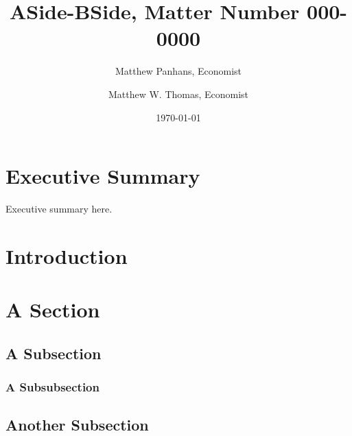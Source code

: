 \documentclass[12pt,final]{bememo}
\title{ASide-BSide, Matter Number 000-0000}
\author{Matthew Panhans, Economist \and Matthew W. Thomas, Economist}
\date{\today}
\begin{document}
\maketitle

\section*{Executive Summary}\label{sec:exec}

Executive summary here.

\section{Introduction}

\econ[2-3]

\section{A Section}

\econ[4]

\subsection{A Subsection}

\econ[5-7]

\subsubsection{A Subsubsection}

\econ[8-10]

\subsection{Another Subsection}

\econ[11-15]
\end{document}
